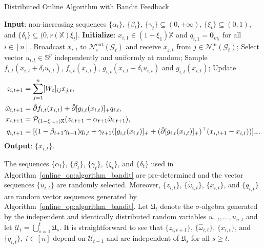 \documentclass[12pt,draftcls,onecolumn]{IEEEtran}%
\DeclareMathOperator{\inout}{in}
\DeclareMathOperator{\outin}{out}
\begin{document}
\begin{algorithm}
	\caption{Distributed Online Algorithm with Bandit Feedback}
	\begin{algorithmic}\label{online_op:algorithm_bandit}
		\STATE \textbf{Input}:   non-increasing sequences $\{\alpha_{t}\}$, $\{\beta_{t}\}$, $\{\gamma_{t}\}\subseteq(0,+\infty)$, $\{\xi_{t}\}\subseteq(0,1)$, and $\{\delta_{t}\}\subseteq(0,r(\mathbb{X})\xi_{t}]$.
		\STATE \textbf{Initialize}:  $x_{i,1}\in(1-\xi_1)\mathbb{X}$ and $q_{i,1}={\bm 0}_{m_i}$ for all $i\in[n]$.
		\STATE  Broadcast $x_{i,t}$ to $\mathcal{N}^{\outin}_i(\mathcal{G}_{t})$ and receive $x_{j,t}$ from $j\in\mathcal{N}^{\inout}_i(\mathcal{G}_{t})$;
		\STATE Select vector $u_{i,t}\in\mathbb{S}^{p}$ independently and uniformly at random;
		\STATE Sample $f_{i,t}(x_{i,t}+\delta_{t}u_{i,t})$, $f_{i,t}(x_{i,t})$, $g_{i,t}(x_{i,t}+\delta_{t}u_{i,t})$ and $g_{i,t}(x_{i,t})$;
		\STATE  Update \begin{align}
			z_{i,t+1}&=\sum_{j=1}^n[W_{t}]_{ij}x_{j,t},\label{online_op:al_z_bandit}\\
			\hat{\omega}_{i,t+1}&=\hat{\partial}f_{i,t}(x_{i,t})+\hat{\partial}[g_{i,t}(x_{i,t})]_+ q_{i,t},\label{online_op:al_bigomega_bandit}\\
			x_{i,t+1}&={\mathcal{P}}_{(1-\xi_{t+1})\mathbb{X}}(z_{i,t+1}-\alpha_{t+1}\hat{\omega}_{i,t+1}),\label{online_op:al_x_bandit}\\
			q_{i,t+1}&=[(1-\beta_{t+1}\gamma_{t+1})q_{i,t}+\gamma_{t+1}([g_{i,t}(x_{i,t})]_+
			+(\hat{\partial} [g_{i,t}(x_{i,t})]_+)^\top(x_{i,t+1}-x_{i,t}))]_{+}.\label{online_op:al_q_bandit}
		\end{align}
		\ENDFOR
		\ENDFOR
		\STATE  \textbf{Output}: $\{x_{i,t}\}$.
	\end{algorithmic}
\end{algorithm}

The sequences $\{\alpha_{t}\}$, $\{\beta_{t}\}$, $\{\gamma_{t}\}$, $\{\xi_{t}\}$, and $\{\delta_{t}\}$ used in Algorithm~\ref{online_op:algorithm_bandit} are pre-determined and the vector sequences $\{u_{i,t}\}$ are randomly selected. Moreover,
$\{z_{i,t}\}$, $\{\hat{\omega}_{i,t}\}$, $\{x_{i,t}\}$, and $\{q_{i,t}\}$ are random vector sequences generated by Algorithm~\ref{online_op:algorithm_bandit}. Let $\mathfrak{U}_t$ denote the $\sigma$-algebra generated by the independent and identically distributed random variables $u_{1,t},\dots,u_{n,t}$ and let $\mathcal{U}_t=\bigcup_{s=1}^{t}\mathfrak{U}_s$. It is straightforward to see that $\{z_{i,t+1}\}$, $\{\hat{\omega}_{i,t}\}$, $\{x_{i,t}\}$, and $\{q_{i,t}\},~i\in[n]$ depend on $\mathcal{U}_{t-1}$ and are independent of $\mathfrak{U}_s$ for all $s\ge t$. 
\end{document}
